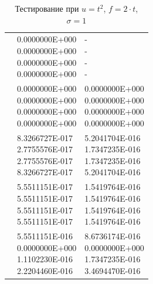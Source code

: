 \begin{table}
	\caption{Тестирование при $u = t^2$, $f = 2 \cdot t$, $\sigma = 1$}
	\centering
	\small
	\begin{tabularx}{1.0\textwidth}{| >{\raggedright\arraybackslash}X | >{\raggedright\arraybackslash}X |>{\raggedright\arraybackslash}X |}
		\hline
		\centering{Временной слой} & \centering{Абсолютная погрешность} & \centering{Относительная погрешность} \tabularnewline \hline
		
		\centering{0.0} & \centering{0.0000000E+000 \\ 0.0000000E+000 \\ 
		0.0000000E+000 \\ 
		0.0000000E+000} & \centering{- \\ - \\ - \\ -} \tabularnewline \hline
		
		\centering{0.2} & \centering{0.0000000E+000 \\ 0.0000000E+000 \\ 
			0.0000000E+000 \\ 
			0.0000000E+000} & \centering{0.0000000E+000 \\ 0.0000000E+000 \\ 
			0.0000000E+000 \\ 
			0.0000000E+000} \tabularnewline \hline
		
		\centering{0.4} & \centering{8.3266727E-017 \\
			2.7755576E-017 \\
			2.7755576E-017 \\
			8.3266727E-017} & \centering{5.2041704E-016 \\
			1.7347235E-016 \\
			1.7347235E-016 \\
			5.2041704E-016} \tabularnewline \hline
		
		\centering{0.6} & \centering{5.5511151E-017 \\
			5.5511151E-017 \\
			5.5511151E-017 \\
			5.5511151E-017} & \centering{1.5419764E-016 \\
			1.5419764E-016 \\
			1.5419764E-016 \\
			1.5419764E-016} \tabularnewline \hline
		
		\centering{0.8} & \centering{5.5511151E-016 \\
			0.0000000E+000 \\
			1.1102230E-016 \\
			2.2204460E-016} & \centering{8.6736174E-016 \\
			0.0000000E+000 \\ 
			1.7347235E-016 \\ 
			3.4694470E-016} \tabularnewline \hline
		

\end{tabularx}
\end{table}
